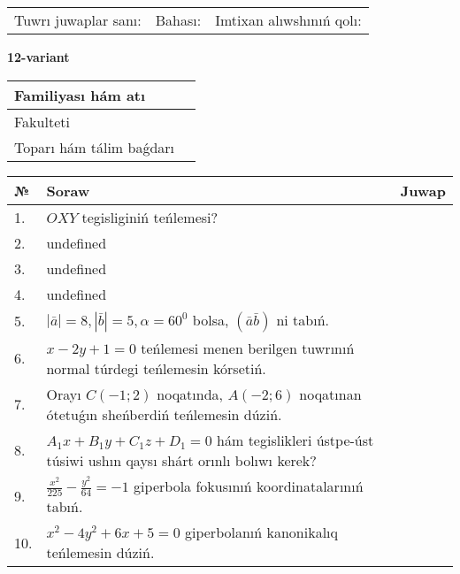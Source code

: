 \documentclass{article}
\begin{document}
\vspace{0.7cm}

\begin{tabular}{lll}
Tuwrı juwaplar sanı: \underline{\hspace{1cm}} & 
Bahası: \underline{\hspace{1cm}} & 
Imtixan alıwshınıń qolı: \underline{\hspace{2cm}} \\
\end{tabular}

\egroup

\newpage


\textbf{12-variant}\\

\bgroup
\def\arraystretch{1.6} %

\begin{tabular}{|m{5.7cm}|m{9.5cm}|}
\hline
Familiyası hám atı & \\
\hline
Fakulteti  & \\
\hline
Toparı hám tálim baǵdarı  & \\
\hline
\end{tabular}

\vspace{0.7cm}

\begin{tabular}{|m{0.7cm}|m{10cm}|m{4cm}|}
\hline
№ & Soraw & Juwap \\
\hline
1. & \(OXY\) tegisliginiń teńlemesi? &  \\
\hline
2. & undefined &  \\
\hline
3. & undefined &  \\
\hline
4. & undefined &  \\
\hline
5. & \(\left| \bar{a} \right| = 8, \left| \bar{b} \right| = 5, \alpha = 60^{0}\) bolsa, \(( \bar{a}\bar{b} )\) ni tabıń. &  \\
\hline
6. & \(x - 2 y + 1 = 0\) teńlemesi menen berilgen tuwrınıń normal túrdegi teńlemesin kórsetiń. &  \\
\hline
7. & Orayı \(C (- 1;2)\) noqatında, \(A (- 2;6 )\) noqatınan ótetuǵın sheńberdiń teńlemesin dúziń. &  \\
\hline
8. & \(A_{1}x + B_{1}y + C_{1}z + D_{1} = 0\) hám tegislikleri ústpe-úst túsiwi ushın qaysı shárt orınlı bolıwı kerek? &  \\
\hline
9. & \(\frac{x^{2}}{225} - \frac{y^{2}}{64} = - 1\) giperbola fokusınıń koordinatalarınıń tabıń. &  \\
\hline
10. & \(x^{2} - 4 y^{2} + 6 x + 5 = 0\) giperbolanıń kanonikalıq teńlemesin dúziń. & \\
\hline
\end{tabular}
\end{document}

